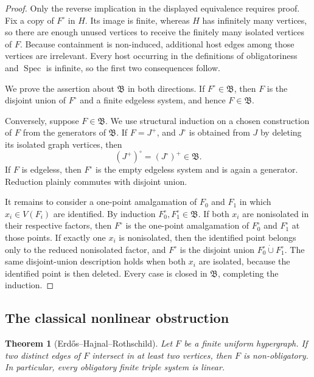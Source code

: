 \documentclass[11pt]{amsart}
\newtheorem{theorem}{Theorem}[section]
\theoremstyle{definition}
\theoremstyle{remark}
\numberwithin{equation}{section}
\DeclareMathOperator{\Spec}{Spec}
\newcommand{\Bclass}{\mathfrak B}
\begin{document}
\begin{proof}
Only the reverse implication in the displayed equivalence requires
proof.  Fix a copy of $F^\circ$ in $H$.  Its image is finite, whereas
$H$ has infinitely many vertices, so there are enough unused vertices
to receive the finitely many isolated vertices of $F$.  Because
containment is non-induced, additional host edges among those vertices
are irrelevant.  Every host occurring in the definitions of
obligatoriness and $\Spec$ is infinite, so the first two consequences
follow.

We prove the assertion about $\Bclass$ in both directions.  If
$F^\circ\in\Bclass$, then $F$ is the disjoint union of $F^\circ$ and a
finite edgeless system, and hence $F\in\Bclass$.

Conversely, suppose $F\in\Bclass$.  We use structural induction on a
chosen construction of $F$ from the generators of $\Bclass$.  If
$F=J^+$, and $J^\circ$ is obtained from $J$ by deleting its isolated
graph vertices, then
\[
  (J^+)^\circ=(J^\circ)^+\in\Bclass.
\]
If $F$ is edgeless, then $F^\circ$ is the empty edgeless system and is
again a generator.  Reduction plainly commutes with disjoint union.

It remains to consider a one-point amalgamation of $F_0$ and $F_1$ in
which $x_i\in V(F_i)$ are identified.  By induction
$F_0^\circ,F_1^\circ\in\Bclass$.  If both $x_i$ are nonisolated in their
respective factors, then $F^\circ$ is the one-point amalgamation of
$F_0^\circ$ and $F_1^\circ$ at those points.  If exactly one $x_i$ is
nonisolated, then the identified point belongs only to the reduced
nonisolated factor, and $F^\circ$ is the disjoint union
$F_0^\circ\mathbin{\dot\cup}F_1^\circ$.  The same disjoint-union
description holds when both $x_i$ are isolated, because the identified
point is then deleted.  Every case is closed in $\Bclass$, completing
the induction.
\end{proof}

\subsection{The classical nonlinear obstruction}

\begin{theorem}[Erd\H{o}s--Hajnal--Rothschild]
\label{thm:EHR-nonlinear}
Let $F$ be a finite uniform hypergraph.  If two distinct edges of $F$
intersect in at least two vertices, then $F$ is non-obligatory.  In
particular, every obligatory finite triple system is linear.
\end{theorem}
\end{document}
